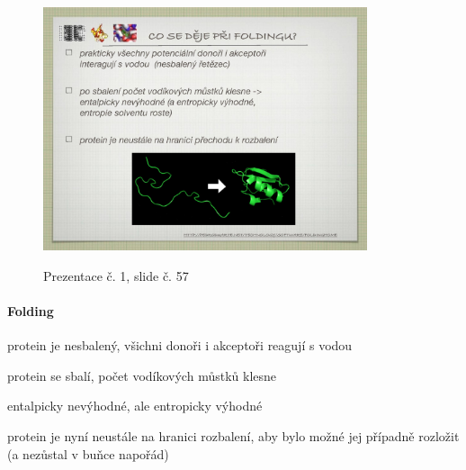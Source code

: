 \documentclass[DIV=8]{scrreprt}
\begin{document}
\begin{figure}
    \caption{Prezentace č. 1, slide č. 57}
    \includegraphics[width=0.85\textwidth]{slides-1/slide-57.jpg}
    \centering
    \label{slides-1-slide-57}
\end{figure}

\paragraph{Folding}
\begin{myEnumerate}[nosep]
    \item protein je nesbalený, všichni donoři i akceptoři reagují s vodou
    \item protein se sbalí, počet vodíkových můstků klesne
\begin{myItemize}[nosep]
    \item entalpicky nevýhodné, ale entropicky výhodné
\end{myItemize}

    \item protein je nyní neustále na hranici rozbalení, aby bylo možné jej případně rozložit (a nezůstal v buňce napořád)
\end{myEnumerate}
\end{document}
